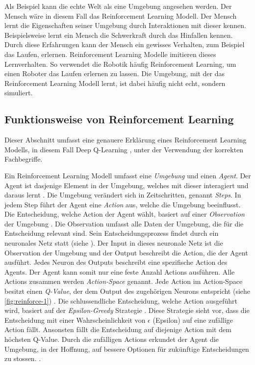 Als Beispiel kann die echte Welt als eine Umgebung angesehen werden. Der Mensch
wäre in diesem Fall das Reinforcement Learning Modell. Der Mensch lernt die
Eigenschaften seiner Umgebung durch Interaktionen mit dieser kennen.
Beispielsweise lernt ein Mensch die Schwerkraft durch das Hinfallen kennen.
Durch diese Erfahrungen kann der Mensch ein gewisses Verhalten, zum Beispiel das
Laufen, erlernen. Reinforcement Learning Modelle imitieren dieses Lernverhalten.
So verwendet die Robotik häufig Reinforcement Learning, um einen Roboter das
Laufen erlernen zu lassen. Die Umgebung, mit der das Reinforcement Learning
Modell lernt, ist dabei häufig nicht echt, sondern simuliert.
 
\subsection{Funktionsweise von Reinforcement Learning}\label{sub:t_rl_func}
Dieser Abschnitt umfasst eine genauere Erklärung eines Reinforcement Learning
Modells, in diesem Fall Deep Q-Learning \cite{mnih_playing_2013}, unter der
Verwendung der korrekten Fachbegriffe.
 
Ein Reinforcement Learning Modell umfasst eine \emph{Umgebung} und einen
\emph{Agent}. Der Agent ist dasjenige Element in der Umgebung, welches mit
dieser interagiert und daraus lernt \cite[S. 53]{sutton_reinforcement_2014}. Die
Umgebung verändert sich in Zeitschritten, genannt \emph{Steps}. In jedem Step
führt der Agent eine \emph{Action} aus, welche die Umgebung beeinflusst. Die
Entscheidung, welche Action der Agent wählt, basiert auf einer
\emph{Observation} der Umgebung \cite[S. 2]{mnih_playing_2013}. Die Observation
umfasst alle Daten der Umgebung, die für die Entscheidung relevant sind. Sein Entscheidungsprozess findet durch ein neuronales Netz statt
(siehe ). Der Input in dieses neuronale Netz ist die
Observation der Umgebung und der Output beschreibt die Action, die der Agent
ausführt. Jedes Neuron des Outputs beschreibt eine spezifische Action des
Agents. Der Agent kann somit nur eine feste Anzahl Actions ausführen. Alle
Actions zusammen werden \emph{Action-Space} \cite[S.
67]{sutton_reinforcement_2014} genannt. Jede Action im Action-Space besitzt
einen \emph{Q-Value}, der dem Output des zugehörigen Neurons entspricht (siehe
\autoref{fig:reinforce-1}) \cite{wang_deep_2021}. Die schlussendliche
Entscheidung, welche Action ausgeführt wird, basiert auf der
\emph{Epsilon-Greedy} Strategie \cite[S. 34]{sutton_reinforcement_2014}. Diese
Strategie sieht vor, dass die Entscheidung mit einer Wahrscheinlichkeit von
$\epsilon$ (Epsilon) auf eine zufällige Action fällt. Ansonsten fällt die
Entscheidung auf diejenige Action mit dem höchsten Q-Value. Durch die zufälligen
Actions erkundet der Agent die Umgebung, in der Hoffnung, auf bessere Optionen
für zukünftige Entscheidungen zu stossen.
\cite{rajendra_koppula_exploration_nodate}.
 
